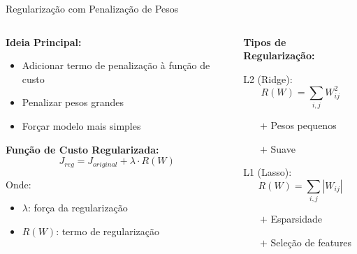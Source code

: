 \documentclass[xcolor=dvipsnames,t,aspectratio=169]{beamer}
\newcommand{\highlight}[1]{{\color{nes_dark_orange} #1}}
\begin{document}
\begin{frame}[c]{Regularização com Penalização de Pesos}
    \begin{columns}[c]
        \begin{column}{0.55\textwidth}
            \textbf{Ideia Principal:}
            \begin{itemize}
                \item Adicionar termo de penalização à função de custo
                \item Penalizar pesos grandes
                \item Forçar modelo mais simples
            \end{itemize}
            
            \vspace{0.5cm}
            \textbf{Função de Custo Regularizada:}
            $$J_{reg} = J_{original} + \lambda \cdot R(W)$$
            
            Onde:
            \begin{itemize}
                \item $\lambda$: força da regularização
                \item $R(W)$: termo de regularização
            \end{itemize}
        \end{column}
        \begin{column}{0.45\textwidth}
            \textbf{Tipos de Regularização:}
            
            \highlight{L2 (Ridge):}
            $$R(W) = \sum_{i,j} W_{ij}^2$$
            
            \begin{itemize}
                \item[$+$] Pesos pequenos
                \item[$+$] Suave
            \end{itemize}
            
            \highlight{L1 (Lasso):}
            $$R(W) = \sum_{i,j} |W_{ij}|$$
            
            \begin{itemize}
                \item[$+$] Esparsidade
                \item[$+$] Seleção de features
            \end{itemize}
        \end{column}
    \end{columns}
\end{frame}
\end{document}
